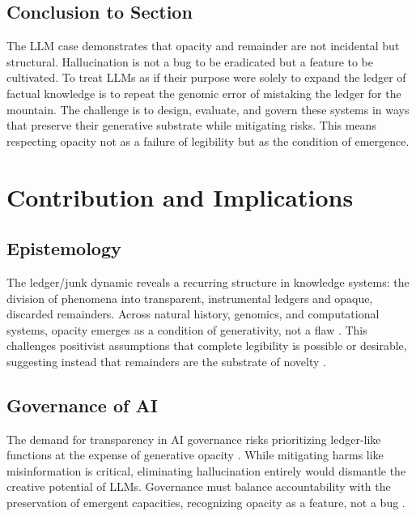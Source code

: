 \documentclass[12pt]{article}
\begin{document}
\subsection{Conclusion to Section}
The LLM case demonstrates that opacity and remainder are not incidental but structural. Hallucination is not a bug to be eradicated but a feature to be cultivated. To treat LLMs as if their purpose were solely to expand the ledger of factual knowledge is to repeat the genomic error of mistaking the ledger for the mountain. The challenge is to design, evaluate, and govern these systems in ways that preserve their generative substrate while mitigating risks. This means respecting opacity not as a failure of legibility but as the condition of emergence.

\section{Contribution and Implications}

\subsection{Epistemology}
The ledger/junk dynamic reveals a recurring structure in knowledge systems: the division of phenomena into transparent, instrumental ledgers and opaque, discarded remainders. Across natural history, genomics, and computational systems, opacity emerges as a condition of generativity, not a flaw \citep{kuhn1962, rheinberger1997}. This challenges positivist assumptions that complete legibility is possible or desirable, suggesting instead that remainders are the substrate of novelty \citep{barad2007}.

\subsection{Governance of AI}
The demand for transparency in AI governance risks prioritizing ledger-like functions at the expense of generative opacity \citep{burrell2016}. While mitigating harms like misinformation is critical, eliminating hallucination entirely would dismantle the creative potential of LLMs. Governance must balance accountability with the preservation of emergent capacities, recognizing opacity as a feature, not a bug \citep{jasanoff2004, glissant1997}.
\end{document}
